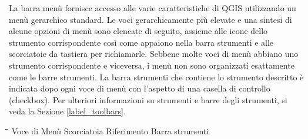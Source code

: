 La barra menù fornisce accesso alle varie caratteristiche di QGIS utilizzando un menù
gerarchico standard. Le voci gerarchicamente più elevate e una sintesi di alcune opzioni
di menù sono elencate di seguito, assieme alle icone dello strumento corrispondente
così come appaiono nella barra strumenti e alle scorciatoie da tastiera per richiamarle.
Sebbene molte voci di menù abbiano uno strumento corrispondente e viceversa,
i menù non sono organizzati esattamente come le barre strumenti. 
La barra strumenti che contiene lo strumento descritto è indicata dopo ogni voce di menù
con l'aspetto di una casella di controllo (checkbox).
Per ulteriori informazioni su strumenti e barre degli strumenti, si veda la Sezione \ref{label_toolbars}.

\begin{tabbing}
\hspace{5.5cm}\=\hspace{3cm}\=\hspace{3.5cm}\= \kill
\hspace{1cm} Voce di Menù \> Scorciatoia \> Riferimento \> Barra strumenti\\
\end{tabbing}

